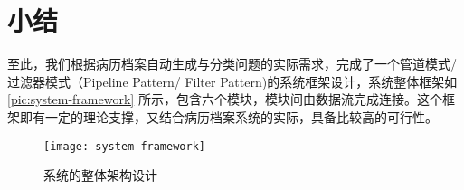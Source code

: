 \section{小结}
至此，我们根据病历档案自动生成与分类问题的实际需求，完成了一个管道模式/过滤器模式（Pipeline Pattern/ Filter Pattern)的系统框架设计，系统整体框架如\autoref{pic:system-framework}
所示，包含六个模块，模块间由数据流完成连接。这个框架即有一定的理论支撑，又结合病历档案系统的实际，具备比较高的可行性。
\begin{figure}
	\centering
	\texttt{[image: system-framework]}
	\caption{系统的整体架构设计}
	\label{pic:system-framework}
\end{figure}

